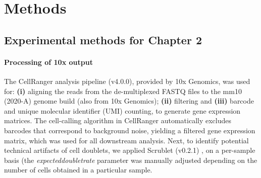 
\chapter{Methods}
\label{chapter5}
\newpage

\section{Experimental methods for Chapter 2}
\label{sec:chp4_methods1}

\subsubsection{\large Processing of 10x output}
The CellRanger analysis pipeline (v4.0.0), provided by 10x Genomics, was used for: \textbf{(i)} aligning the reads from the de-multiplexed FASTQ files to the mm10 (2020-A) genome build (also from 10x Genomics); \textbf{(ii)} filtering and \textbf{(iii)} barcode and unique molecular identifier (UMI) counting, to generate gene expression matrices. The cell-calling algorithm in CellRanger automatically excludes barcodes that correspond to background noise, yielding a filtered gene expression matrix, which was used for all downstream analysis. Next, to identify potential technical artifacts of cell doublets, we applied Scrublet (v0.2.1) \textbf{\cite{wolock_scrublet_2019}}, on a per-sample basis (the \textit{expected\textunderscore doublet\textunderscore rate} parameter was manually adjusted depending on the number of cells obtained in a particular sample. 

